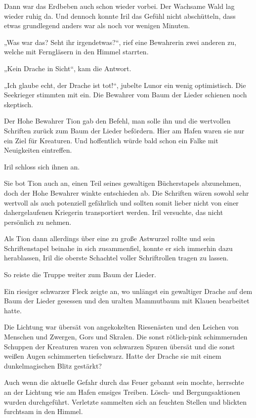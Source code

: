 Dann war das Erdbeben auch schon wieder vorbei. Der Wachsame Wald lag wieder ruhig da. Und dennoch konnte Iril das Gefühl nicht abschütteln, dass etwas grundlegend anders war als noch vor wenigen Minuten.

„Was war das? Seht ihr irgendetwas?“, rief eine Bewahrerin zwei anderen zu, welche mit Ferngläsern in den Himmel starrten.

„Kein Drache in Sicht“, kam die Antwort.

„Ich glaube echt, der Drache ist tot!“, jubelte Lunor ein wenig optimistisch. Die Seekrieger stimmten mit ein. Die Bewahrer vom Baum der Lieder schienen noch skeptisch.

Der Hohe Bewahrer Tion gab den Befehl, man solle ihn und die wertvollen Schriften zurück zum Baum der Lieder befördern. Hier am Hafen waren sie nur ein Ziel für Kreaturen. Und hoffentlich würde bald schon ein Falke mit Neuigkeiten eintreffen.

Iril schloss sich ihnen an.

Sie bot Tion auch an, einen Teil seines gewaltigen Bücherstapels abzunehmen, doch der Hohe Bewahrer winkte entschieden ab. Die Schriften wären sowohl sehr wertvoll als auch potenziell gefährlich und sollten somit lieber nicht von einer dahergelaufenen Kriegerin transportiert werden. Iril versuchte, das nicht persönlich zu nehmen.

Als Tion dann allerdings über eine zu große Astwurzel rollte und sein Schriftenstapel beinahe in sich zusammenfiel, konnte er sich immerhin dazu herablassen, Iril die oberste Schachtel voller Schriftrollen tragen zu lassen.

So reiste die Truppe weiter zum Baum der Lieder.



\trennzeichen



Ein riesiger schwarzer Fleck zeigte an, wo unlängst ein gewaltiger Drache auf dem Baum der Lieder gesessen und den uralten Mammutbaum mit Klauen bearbeitet hatte.

Die Lichtung war übersät von angekokelten Riesenästen und den Leichen von Menschen und Zwergen, Gors und Skralen. Die sonst rötlich-pink schimmernden Schuppen der Kreaturen waren von schwarzen Spuren übersät und die sonst weißen Augen schimmerten tiefschwarz. Hatte der Drache sie mit einem dunkelmagischen Blitz gestärkt?

Auch wenn die aktuelle Gefahr durch das Feuer gebannt sein mochte, herrschte an der Lichtung wie am Hafen emsiges Treiben. Lösch- und Bergungsaktionen wurden durchgeführt. Verletzte sammelten sich an feuchten Stellen und blickten furchtsam in den Himmel.

